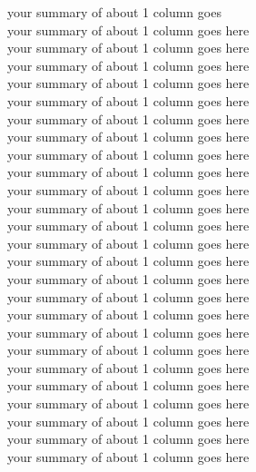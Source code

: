 {\pagestyle{empty}
\normalsize
\setlength\columnsep{20pt}
\par\vskip 1cm

your summary of about 1 column goes\\
your summary of about 1 column goes here\\
your summary of about 1 column goes here\\
your summary of about 1 column goes here\\
your summary of about 1 column goes here\\
your summary of about 1 column goes here\\
your summary of about 1 column goes here\\
your summary of about 1 column goes here\\
your summary of about 1 column goes here\\
your summary of about 1 column goes here\\
your summary of about 1 column goes here\\
your summary of about 1 column goes here\\
your summary of about 1 column goes here\\
your summary of about 1 column goes here\\
your summary of about 1 column goes here\\
your summary of about 1 column goes here\\
your summary of about 1 column goes here\\
your summary of about 1 column goes here\\
your summary of about 1 column goes here\\
your summary of about 1 column goes here\\
your summary of about 1 column goes here\\
your summary of about 1 column goes here\\
your summary of about 1 column goes here\\
your summary of about 1 column goes here\\
your summary of about 1 column goes here\\
your summary of about 1 column goes here\\
}
